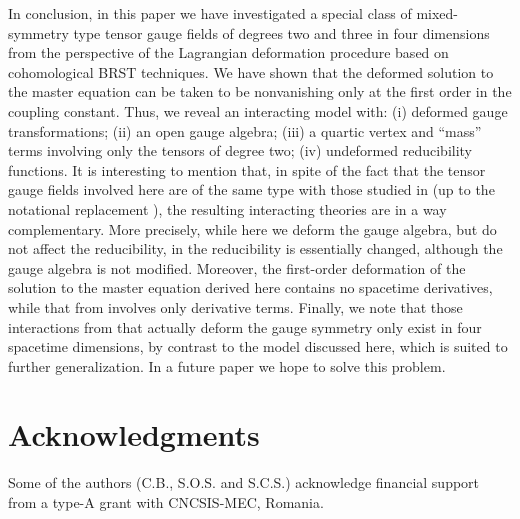 \documentclass[a4paper,12pt]{article}
\begin{document}
In conclusion, in this paper we have investigated a special class
of mixed-symmetry type tensor gauge fields of degrees two and
three in four dimensions from the perspective of the Lagrangian
deformation procedure based on cohomological BRST techniques. We
have shown that the deformed solution to the master equation can
be taken to be nonvanishing only at the first order in the
coupling constant. Thus, we reveal an interacting model with: (i)
deformed gauge transformations; (ii) an open gauge algebra; (iii)
a quartic vertex and ``mass'' terms involving only the tensors of
degree two; (iv) undeformed reducibility functions. It is
interesting to mention that, in spite of the fact that the tensor
gauge fields involved here are of the same type with those studied
in \cite{EPJC} (up to the notational replacement
\coordHE{}), the resulting interacting theories are
in a way complementary. More precisely, while here we deform the
gauge algebra, but do not affect the reducibility, in \cite{EPJC}
the reducibility is essentially changed, although the gauge
algebra is not modified. Moreover, the first-order deformation of
the solution to the master equation derived here contains no
spacetime derivatives, while that from \cite{EPJC} involves only
derivative terms. Finally, we note that those interactions from
\cite{EPJC} that actually deform the gauge symmetry only exist in
four spacetime dimensions, by contrast to the model discussed
here, which is suited to further generalization. In a future paper
we hope to solve this problem.

\section*{Acknowledgments}

Some of the authors (C.B., S.O.S. and S.C.S.) acknowledge
financial support from a type-A grant with CNCSIS-MEC, Romania.
\end{document}
